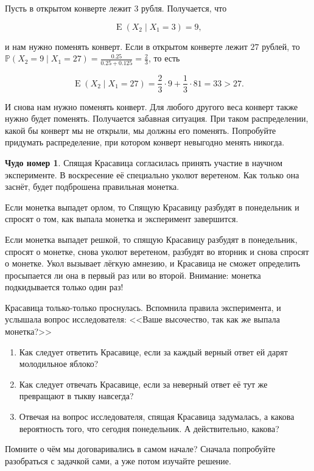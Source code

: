 \documentclass[12pt, a4paper, oneside]{extreport}
\DeclareMathOperator{\E}{\mathop{E}}
\def \mbb{\mathbb}
\def \PP{\mbb{P}}
\theoremstyle{plain}              %
\theoremstyle{definition}         %
\newtheorem{chudo}{Чудо номер}   %
\begin{document}
Пусть в открытом конверте лежит $3$ рубля. Получается, что

\[\E(X_2 \mid X_1 = 3) = 9,\]

и нам нужно поменять конверт. Если в открытом конверте лежит $27$ рублей, то $\PP(X_2 = 9 \mid X_1 = 27) = \frac{0.25}{0.25 + 0.125} = \frac{2}{3}$, то есть

\[ \E(X_2 \mid X_1 = 27) = \frac{2}{3} \cdot 9 + \frac{1}{3} \cdot 81 = 33 > 27.\]

И снова нам нужно поменять конверт. Для любого другого веса конверт также нужно будет поменять. Получается забавная ситуация. При таком распределении, какой бы конверт мы не открыли, мы должны его поменять. Попробуйте придумать распределение, при котором конверт невыгодно менять никогда. 

\begin{chudo}
Спящая Красавица согласилась принять участие в научном эксперименте. В воскресение её специально уколют веретеном. Как только она заснёт, будет подброшена правильная монетка.

Если монетка выпадет орлом, то Спящую Красавицу разбудят в понедельник и спросят о том, как выпала монетка и эксперимент завершится.

Если монетка выпадет решкой, то спящую Красавицу разбудят в понедельник, спросят о монетке, снова уколют веретеном, разбудят во вторник и снова спросят о монетке. Укол вызывает лёгкую амнезию, и Красавица не сможет определить просыпается ли она в первый раз или во второй. Внимание: монетка подкидывается только один раз!

Красавица только-только проснулась. Вспомнила правила эксперимента, и услышала вопрос исследователя: <<Ваше высочество, так как же выпала монетка?>>

\begin{enumerate}
\item Как следует ответить Красавице, если за каждый верный ответ ей дарят молодильное яблоко?

\item Как следует отвечать Красавице, если за неверный ответ её тут же превращают в тыкву навсегда?

\item Отвечая на вопрос исследователя, спящая Красавица задумалась, а какова вероятность того, что сегодня понедельник. А действительно, какова?
\end{enumerate}
\end{chudo}

Помните о чём мы договаривались в самом начале? Сначала попробуйте разобраться с задачкой сами, а уже потом изучайте решение. 
\end{document}

